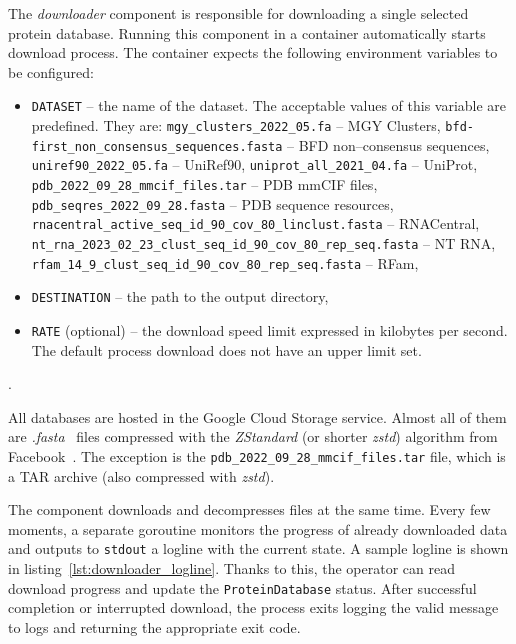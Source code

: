 The \textit{downloader} component is responsible for downloading a single selected protein database.
Running this component in a container automatically starts download process.
The container expects the following environment variables to be configured:

\begin{itemize}
    \item \texttt{DATASET} -- the name of the dataset.
    The acceptable values of this variable are predefined.
    They are:
    \subitem \texttt{mgy\_clusters\_2022\_05.fa} -- MGY Clusters,
    \subitem \texttt{bfd-first\_non\_consensus\_sequences.fasta} -- BFD non--consensus sequences,
    \subitem \texttt{uniref90\_2022\_05.fa} -- UniRef90,
    \subitem \texttt{uniprot\_all\_2021\_04.fa} -- UniProt,
    \subitem \texttt{pdb\_2022\_09\_28\_mmcif\_files.tar} -- PDB mmCIF files,
    \subitem \texttt{pdb\_seqres\_2022\_09\_28.fasta} -- PDB sequence resources,
    \subitem \texttt{rnacentral\_active\_seq\_id\_90\_cov\_80\_linclust.fasta} -- RNACentral,
    \subitem \texttt{nt\_rna\_2023\_02\_23\_clust\_seq\_id\_90\_cov\_80\_rep\_seq.fasta} -- NT RNA,
    \subitem \texttt{rfam\_14\_9\_clust\_seq\_id\_90\_cov\_80\_rep\_seq.fasta} -- RFam,
    \item \texttt{DESTINATION} -- the path to the output directory,
    \item \texttt{RATE} (optional) -- the download speed limit expressed in kilobytes per second.
    The default process download does not have an upper limit set.
\end{itemize}.

All databases are hosted in the Google Cloud Storage service.
Almost all of them are \textit{.fasta}~\cite{pearson1988fasta} files compressed with the \textit{ZStandard} (or shorter \textit{zstd}) algorithm from Facebook~\cite{zstandard}.
The exception is the \texttt{pdb\_2022\_09\_28\_mmcif\_files.tar} file, which is a TAR archive (also compressed with \textit{zstd}).

The component downloads and decompresses files at the same time.
Every few moments, a separate goroutine monitors the progress of already downloaded data and outputs to \texttt{stdout} a logline with the current state.
A sample logline is shown in listing~\ref{lst:downloader_logline}.
Thanks to this, the operator can read download progress and update the \texttt{ProteinDatabase} status.
After successful completion or interrupted download, the process exits logging the valid message to logs and returning the appropriate exit code.

